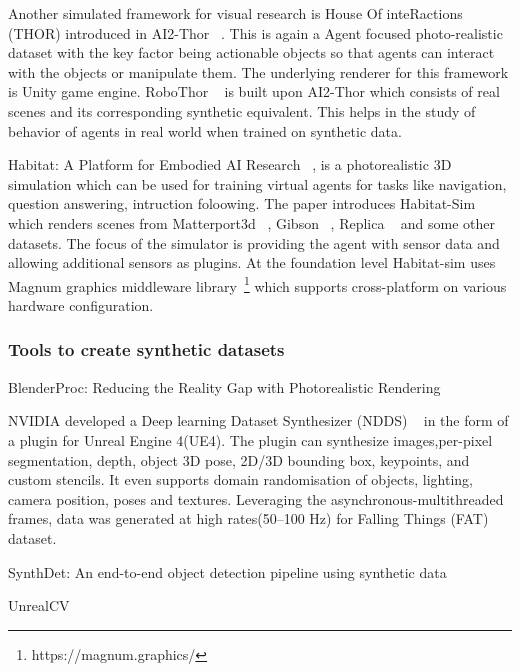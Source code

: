 Another simulated framework for visual research is House Of inteRactions (THOR) introduced in AI2-Thor ~\cite{kolve2019ai2thor}.
This is again a Agent focused photo-realistic dataset with the key factor being actionable objects so that agents can interact with the objects or manipulate them.
The underlying renderer for this framework is Unity game engine.
RoboThor ~\cite{Deitke2020RoboTHORAO} is built upon AI2-Thor which consists of real scenes and its corresponding synthetic equivalent.
This helps in the study of behavior of agents in real world when trained on synthetic data.

Habitat: A Platform for Embodied AI Research ~\cite{savva2019habitat}, is a photorealistic 3D simulation which can be used for training virtual agents for tasks like navigation, question answering, intruction foloowing.
The paper introduces Habitat-Sim which renders scenes from Matterport3d ~\cite{chang2017matterport3d}, Gibson ~\cite{xia2018gibson}, Replica ~\cite{Straub2019TheRD} and some other datasets.
The focus of the simulator is providing the agent with sensor data and allowing additional sensors as plugins.
At the foundation level Habitat-sim uses Magnum graphics
middleware library~\footnote{https://magnum.graphics/} which supports cross-platform on various hardware configuration.


\subsubsection{Tools to create synthetic datasets}

BlenderProc: Reducing the Reality Gap with Photorealistic Rendering ~\cite{denninger2019blenderproc}

NVIDIA developed a Deep learning Dataset Synthesizer (NDDS) ~\cite{to2018ndds} in the form of a plugin for Unreal Engine 4(UE4).
The plugin can synthesize images,per-pixel segmentation, depth, object 3D pose, 2D/3D bounding box, keypoints, and custom stencils.
It even supports domain randomisation of objects, lighting, camera position, poses and textures.
Leveraging the asynchronous-multithreaded frames, data was generated at high rates(50–100 Hz) for Falling Things (FAT) ~\cite{tremblay2018falling} dataset.

SynthDet: An end-to-end object detection pipeline using synthetic data

UnrealCV ~\cite{qiu2017unrealcv}


